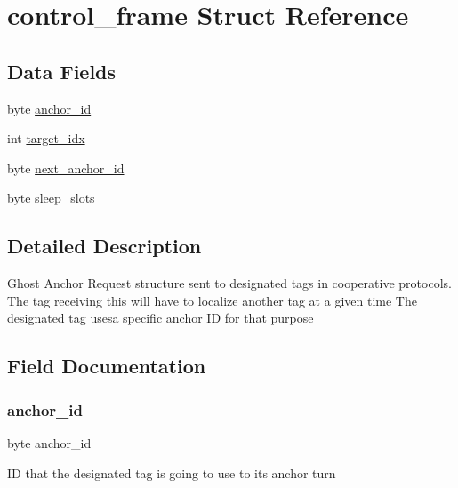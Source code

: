 \hypertarget{structcontrol__frame}{}\section{control\+\_\+frame Struct Reference}
\label{structcontrol__frame}
\subsection*{Data Fields}
\begin{DoxyCompactItemize}
\item 
byte \mbox{\hyperlink{structcontrol__frame_aa94c10c0f07e2f27fe44bca45e59735f}{anchor\+\_\+id}}
\item 
int \mbox{\hyperlink{structcontrol__frame_a7c74492e7941ff4d6d2697ab892f4fe7}{target\+\_\+idx}}
\item 
byte \mbox{\hyperlink{structcontrol__frame_ab7a1283fa788f533f37c47b452cd3589}{next\+\_\+anchor\+\_\+id}}
\item 
byte \mbox{\hyperlink{structcontrol__frame_a669b7e13ef545f7ac9e46bc794b87c63}{sleep\+\_\+slots}}
\end{DoxyCompactItemize}


\subsection{Detailed Description}
Ghost Anchor Request structure sent to designated tags in cooperative protocols. The tag receiving this will have to localize another tag at a given time The designated tag usesa specific anchor ID for that purpose 

\subsection{Field Documentation}
\mbox{\label{structcontrol__frame_aa94c10c0f07e2f27fe44bca45e59735f}} 
\subsubsection{\texorpdfstring{anchor\+\_\+id}{anchor\_id}}
{\footnotesize\ttfamily byte anchor\+\_\+id}

ID that the designated tag is going to use to its anchor turn \mbox{\label{structcontrol__frame_ab7a1283fa788f533f37c47b452cd3589}} 
